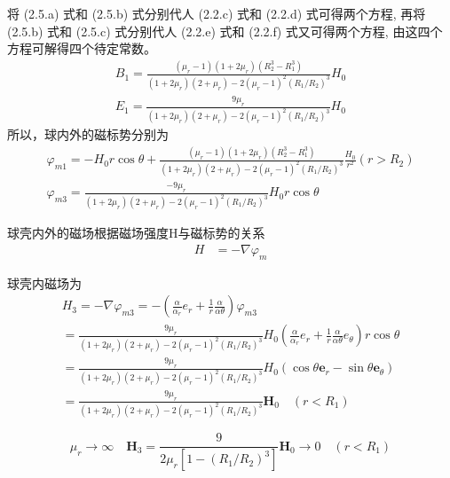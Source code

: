 \documentclass{article}
\begin{document}
将 (2.5.a) 式和 (2.5.b) 式分别代人 (2.2.c) 式和 (2.2.d) 式可得两个方程, 再将 (2.5.b) 式和 (2.5.c) 
式分别代人 (2.2.e) 式和 (2.2.f) 式又可得两个方程, 由这四个方程可解得四个待定常数。 
\begin{align}
B_{1}  = \frac{(\mu _{r}-1)(1+2 \mu _{r})(R_{2}^{3}-R_{1}^{3})}{(1+2 \mu _{r})(2+ \mu _{r})-2(\mu _{r}-1)^{2}(R_{1}/R_{2})^{3}}  H_{0} \tag{2.6.a}\\ 
E_{1}= \frac{9 \mu _{r}}{(1+2 \mu _{r})(2+ \mu _{r})-2(\mu _{r}-1)^{2}(R_{1}/R_{2})^{3}}H_{0} \tag{2.6.b} 
\end{align}
所以，球内外的磁标势分别为
\begin{align}
  \varphi_{m1}=-H_{0}r \cos \theta + \frac{(\mu _{r}-1)(1+2 \mu _{r})(R_{2}^{3}-R_{1}^{3})}{(1+2 \mu _{r})(2+ \mu _{r})-2(\mu _{r}-1)^{2}(R_{1}/R_{2})^{3}}\frac{H_{0}}{r^{2}}(r>R_{2}) \tag{2.7.a}\\
  \varphi_{m3}= \frac{-9 \mu _{r}}{(1+2 \mu _{r})(2+ \mu _{r})-2(\mu _{r}-1)^{2}(R_{1}/R_{2})^{3}}H_{0}r \cos \theta \tag{2.7.b}
\end{align}

球壳内外的磁场根据磁场强度H与磁标势的关系
\begin{align}
  H&=- \nabla \varphi _{m} \tag{2.8}
\end{align}

球壳内磁场为
\begin{equation}
  \begin{array}{l}
    H_{3}=-\nabla \varphi_{m 3}=-\left(\frac{\alpha}{\alpha_{r}} e_{r}+\frac{1}{r} \frac{\alpha}{\alpha \theta}\right) \varphi_{m 3} \\
    =\frac{9 \mu_{r}}{\left(1+2 \mu_{r}\right)\left(2+\mu_{r}\right)-2\left(\mu_{r}-1\right)^{2}\left(R_{1} / R_{2}\right)^{3}} H_{0}\left(\frac{\alpha}{\alpha_{r}} e_{r}+\frac{1}{r} \frac{\alpha}{\alpha \theta} e_{\theta}\right) r \cos \theta \\
    =\frac{9 \mu_{r}}{\left(1+2 \mu_{r}\right)\left(2+\mu_{r}\right)-2\left(\mu_{r}-1\right)^{2}\left(R_{1} / R_{2}\right)^{3}} H_{0}\left(\cos \theta \boldsymbol{e}_{r}-\sin \theta \boldsymbol{e}_{\theta}\right) \\
    =\frac{9 \mu_{r}}{\left(1+2 \mu_{r}\right)\left(2+\mu_{r}\right)-2\left(\mu_{r}-1\right)^{2}\left(R_{1} / R_{2}\right)^{3}} \boldsymbol{H}_{0} \quad\left(r<R_{1}\right)
    \end{array} \tag{2.9}
\end{equation}

\begin{equation}
  \mu_{r} \rightarrow \infty \quad \boldsymbol{H}_{3}=\frac{9}{2 \mu_{r}\left[1-\left(R_{1} / R_{2}\right)^{3}\right]} \boldsymbol{H}_{0} \rightarrow 0 \quad\left(r<R_{1}\right)\tag{2.10}
\end{equation}
\end{document}
